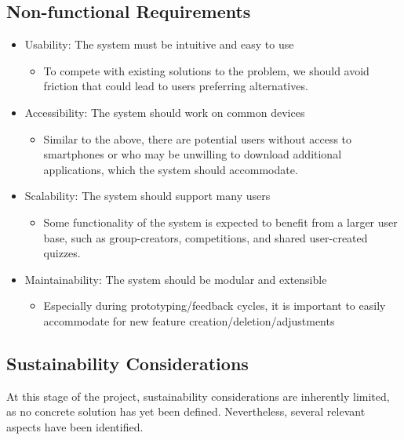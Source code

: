 \subsection{Non-functional Requirements}
\begin{itemize}
    \item Usability: The system must be intuitive and easy to use
    \begin{itemize}
        \footnotesize
        \item[] To compete with existing solutions to the problem, we should avoid friction that could lead to users preferring alternatives.
    \end{itemize}
    \item Accessibility: The system should work on common devices
    \begin{itemize}
        \footnotesize
        \item[] Similar to the above, there are potential users without access to smartphones or who may be unwilling to download additional applications, which the system should accommodate.
    \end{itemize}
    \item Scalability: The system should support many users
    \begin{itemize}
        \footnotesize
        \item[] Some functionality of the system is expected to benefit from a larger user base, such as group-creators, competitions, and shared user-created quizzes.
    \end{itemize}
    \item Maintainability: The system should be modular and extensible
    \begin{itemize}
        \footnotesize
        \item[] Especially during prototyping/feedback cycles, it is important to easily accommodate for new feature creation/deletion/adjustments
    \end{itemize}
\end{itemize}

\subsection{Sustainability Considerations}

At this stage of the project, sustainability considerations are inherently limited,
as no concrete solution has yet been defined.
Nevertheless, several relevant aspects have been identified.

